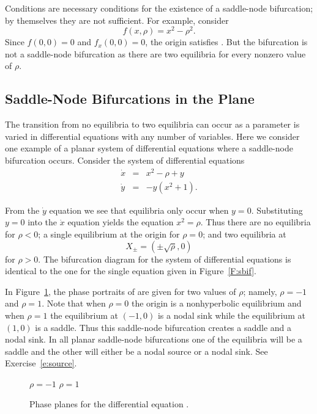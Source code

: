 \documentclass{ximera}
\begin{document}
Conditions  are necessary conditions for the existence of a 
saddle-node bifurcation; by themselves they are not sufficient.  For example, 
consider
\[
f(x,\rho) = x^2 -\rho^2.
\]
Since $f(0,0)=0$ and $f_x(0,0)=0$, the origin satisfies .  But 
the bifurcation is not a saddle-node bifurcation as there 
are two equilibria for every nonzero value of $\rho$.

\subsection*{Saddle-Node Bifurcations in the Plane}

The transition from no equilibria to two equilibria can occur as a 
parameter is varied in differential equations with any number of 
variables.  Here we consider one example of a planar system of 
differential equations where a saddle-node bifurcation occurs.
Consider the system of differential equations 
\begin{equation*}  \label{E:ssys}
\begin{array}{rcl}
\dot{x} & = & x^2 - \rho + y \\
\dot{y} & = & -y(x^2+1).  \end{array}
\end{equation*}

From the $\dot{y}$ equation we see that equilibria only occur 
when $y=0$.  Substituting $y=0$ into the $\dot{x}$ equation yields
the equation $x^2=\rho$.   Thus there are no equilibria for $\rho<0$;
a single equilibrium at the origin for $\rho=0$; and two equilibria
at 
\[
X_{\pm}=(\pm\sqrt{\rho},0)
\]
for $\rho>0$.  The bifurcation diagram 
for the system of differential equations  is identical to
the one for the single equation  given in Figure~\ref{F:sbif}.

In Figure~\ref{F:ssys}, the phase portraits of  are given for 
two values of $\rho$; namely, $\rho=-1$ and $\rho=1$.  Note that when 
$\rho=0$ the origin is a nonhyperbolic 
equilibrium and when $\rho=1$
the equilibrium at $(-1,0)$ is a nodal sink 
while the equilibrium at 
$(1,0)$ is a saddle.  
Thus this saddle-node bifurcation creates a saddle 
and a nodal sink.  In all planar saddle-node bifurcations one of the 
equilibria will be a saddle and the other will either be a nodal source 
or a nodal sink.  See Exercise~\ref{e:source}.

\begin{figure}[htb]
           \centerline{%
	   }
		\vspace*{-0.2in}		
		\hspace{1.3in} $\rho=-1$ \hspace{2.1in} $\rho=1$
   \caption{Phase planes for the differential equation \protect{}.}
           \label{F:ssys}
\end{figure}
\end{document}
